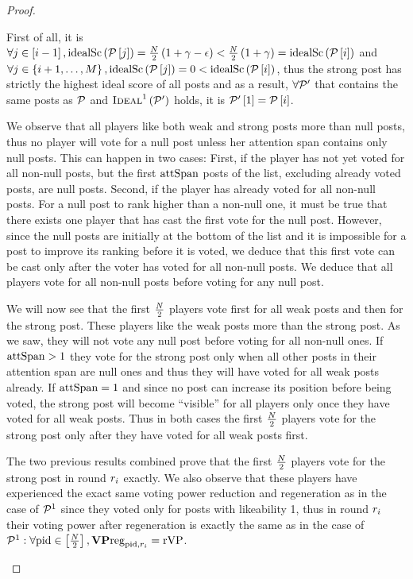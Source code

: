 \begin{proof}
\begin{itemize}
    First of all, it is $\forall j \in \left[i - 1\right],
    \mathrm{idealSc}\left(\mathcal{P}\left[j\right]\right) = \frac{N}{2}\left(1 + \gamma -
    \epsilon\right) < \frac{N}{2}\left(1 + \gamma\right) =
    \mathrm{idealSc}\left(\mathcal{P}\left[i\right]\right)$ and $\forall j \in \left\{i + 1, \dots,
    M\right\}, \mathrm{idealSc}\left(\mathcal{P}\left[j\right]\right) = 0 <
    \mathrm{idealSc}\left(\mathcal{P}\left[i\right]\right)$, thus the strong post has strictly the
    highest ideal score of all posts and as a result, $\forall \mathcal{P}'$ that
    contains the same posts as $\mathcal{P}$ and
    $\textsc{Ideal}^1\left(\mathcal{P}'\right)$ holds, it is
    $\mathcal{P}'\left[1\right] = \mathcal{P}\left[i\right]$.

    We observe that all players like both weak and strong posts more than null
    posts, thus no player will vote for a null post unless her attention span
    contains only null posts. This can happen in two cases: First, if the player
    has not yet voted for all non-null posts, but the first $\mathrm{attSpan}$ posts of
    the list, excluding already voted posts, are null posts. Second, if the
    player has already voted for all non-null posts. For a null post to rank
    higher than a non-null one, it must be true that there exists one player
    that has cast the first vote for the null post. However, since the null
    posts are initially at the bottom of the list and it is impossible for a
    post to improve its ranking before it is voted, we deduce that this first
    vote can be cast only after the voter has voted for all non-null posts. We
    deduce that all players vote for all non-null posts before voting for any
    null post.

    We will now see that the first $\frac{N}{2}$ players vote first for
    all weak posts and then for the strong post. These players like the weak
    posts more than the strong post. As we saw, they will not vote any null
    post before voting for all non-null ones. If $\mathrm{attSpan} > 1$ they vote for
    the strong post only when all other posts in their attention span are null
    ones and thus they will have voted for all weak posts already. If $\mathrm{attSpan}
    = 1$ and since no post can increase its position before being voted, the
    strong post will become ``visible'' for all players only once they have
    voted for all weak posts. Thus in both cases the first
    $\frac{N}{2}$ players vote for the strong post only after they have
    voted for all weak posts first.

    The two previous results combined prove that the first
    $\frac{N}{2}$ players vote for the strong post in round $r_i$
    exactly. We also observe that these players have experienced the exact same
    voting power reduction and regeneration as in the case of $\mathcal{P}^1$
    since they voted only for posts with likeability 1, thus in round $r_i$
    their voting power after regeneration is exactly the same as in the case of
    $\mathcal{P}^1: \forall \mathrm{pid} \in
    \left[\frac{N}{2}\right], \mathrm{\textbf{VP}reg}_{\mathrm{pid}, r_i} =
    \mathrm{rVP}$.


\end{itemize}
\end{proof}
